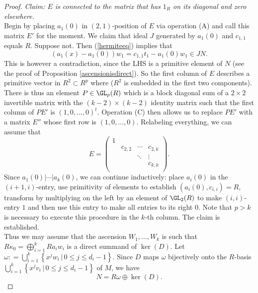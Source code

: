 \begin{proof}
\noindent \textit{Claim:  $ E $ is connected to the matrix that has $ 1_{R} $ on its diagonal and zero elsewhere.} \\
Begin by placing $ a_{1}(0) $ in $ (2, 1) $-position of $ E $ via operation (A) and call this matrix $ E '$ for the moment.  We claim that ideal $ J $  generated by $ a_{1} (0) $ and $ c_{1,1} $ equals $ R $. Suppose not.  
Then  (\ref{hermiteeq})  implies that $$ \left ( a_{1}(x) - a_{1}(0) \right ) w_{1} = c_{1,1} t_{1} -  a_{1}(0) w_{1}  \in J N . $$ 
This is however a contradiction, since the LHS is a primitive element of $ N $ (see the proof of Proposition \ref{ascensionisdirect}). So the first column of $ E $ describes a primitive vector in $ R^{2} \subset  R^{p} $ where ($ R^{2} $ is embedded in the first two components).   There is thus an element $ P \in  \GL_{p}(R) $ which is a block diagonal sum of a $ 2 \times 2 $ invertible matrix with the $ (k-2) \times (k-2)$ identity matrix such that the first column of $ PE' $ is $ (1,0, \ldots, 0)^{t} $. Operation (C) then allows us to replace $ PE' $ with a matrix $ E'' $ whose first row is $ (1, 0, \ldots, 0) $. Relabeling everything, we can assume that $$ E =      \left (  \begin{matrix} 1  &   & %
&  \\
& c_{2,2} & \cdots & c_{2,k} \\
 &  &  \ddots & \vdots  \\
 &  & & c_{k,k} \\
 & 
\end{matrix}  \right   )  . $$
Since $ a_{1}(0) | \cdots | a_{k}(0) $, we can continue inductively:   place $ a_{i}(0) $ in the $ (i+1, i)$-entry, use primitivity of elements to establish $ (a_{i}(0), c_{i,i}) = R $, transform by multiplying on the left by an element of $ \GL_{2}(R) $ to make $ (i,i)$-entry $ 1 $ and then use this entry to make all entries to its right $ 0 $. Note that $ p > k $ is necessary to execute this procedure in the $ k $-th  column.    The claim  is   established.   \\[1em] 
Thus we may assume that the ascension $ W_{1} ,  \ldots , W_{k } $ is such that $ R \kappa_{0} = \bigoplus_{i=1}^{k} R a_{i}w_{i}  $ is a direct summand of $ \ker(D) $. Let 
$ \omega  : =  \bigcup_{i=1}^{k} \left \{  x^{j} w_{i} \, | \, 0 \leq j \leq d_{i} -1 \right \} $. Since $ D $ maps $\omega $ bijectively onto the $ R$-basis $ \bigcup_{i=1}^k \left \{ x^{j} v_{i} \, | \, 0 \leq j \leq d_{i}-1     \right \} $ of $ M $,  we have $$ N =  R \omega  \oplus \ker (D)   . $$ 

\end{proof}
